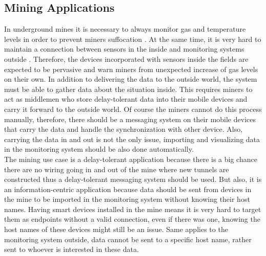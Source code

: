 


\subsection{Mining Applications}

In underground mines it is necessary to always monitor gas and temperature levels in order to prevent miners suffocation \cite{doi:10.1155/2013/159273}. At the same time, it is very hard to maintain a connection between sensors in the inside and  monitoring systems outside \cite{ginzboorg2010dtn}. Therefore, the devices incorporated with sensors inside the fields are expected to be pervasive and warn miners from unexpected increase of gas levels on their own. In addition to delivering the data to the outside world, the system must be able to gather data about the situation inside. This requires miners to act as middlemen who store delay-tolerant data into their mobile devices and carry it forward to the outside world. Of course the miners cannot do this process manually, therefore, there should be a messaging system on their mobile devices that carry the data and handle the synchronization with other device. Also, carrying the data in and out is not the only issue, importing and visualizing  data in the monitoring system should be also done automatically.\\

\noindent The mining use case is a delay-tolerant application because there is a big chance there are no wiring going in and out of the mine where new tunnels are constructed thus a delay-tolerant messaging system should be used. But also, it is an information-centric  application because data should be sent  from  devices in the mine to be imported in  the monitoring system without knowing their host names. Having smart devices installed in the mine means it is very hard to target them as endpoints without a valid connection, even if there was one, knowing the host names of these devices might still be an issue. Same applies to the monitoring system outside,  data cannot be sent to a specific host name, rather sent to whoever is interested in  these data.

